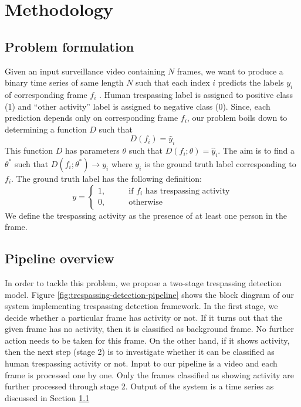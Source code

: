 \section{Methodology}
\label{sec:methodology}
\subsection{Problem formulation}
\label{sec:prob-formulation}
Given an input surveillance video containing $N$ frames, we want to produce a binary time series of same length $N$ such that each index $i$ predicts the labels $y_i$ of corresponding frame $f_i$ . Human trespassing label is assigned to positive class (1) and ``other activity'' label is assigned to negative class (0). Since, each prediction depends only on corresponding frame $f_i$, our problem boils down to determining a function $D$ such that 
$$ D(f_i) = \hat{y}_i $$
This function $D$ has parameters $\theta$ such that $D(f_i;\theta) = \hat{y}_i$. The aim is to find a $\theta^*$ such that $D(f_i;\theta^*) \rightarrow y_i$ where $y_i$ is the ground truth label corresponding to $f_i$. The ground truth label has the following definition: 
$$y=
\begin{cases}
1,  &\qquad \textrm{if } f_i \textrm{ has trespassing activity} \\ 
0, 	&\qquad \textrm{otherwise}
\end{cases}
$$
We define the trespassing activity as the presence of at  least one person in the frame. 

\subsection{Pipeline overview}
In order to tackle this problem, we propose a two-stage trespassing detection model. 
Figure \ref{fig:trespassing-detection-pipeline} shows the block diagram of our system implementing trespassing detection framework. In the first stage, we decide whether a particular frame has activity or not. If it turns out that the given frame has no activity, then it is classified as background frame. No further action needs to be taken for this frame. On the other hand, if it shows activity, then the next step (stage 2) is to investigate whether it can be classified as human trespassing activity or not. Input to our pipeline is a video and each frame is processed one by one. Only the frames classified as showing activity are further processed through stage 2. Output of the system is a time series as discussed in Section \ref{sec:prob-formulation}

